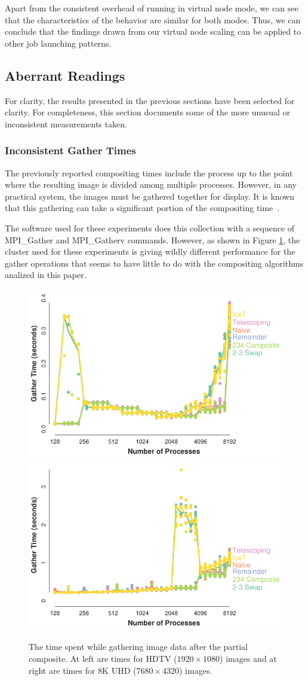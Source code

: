 \documentclass{vgtc}                          %
\newcommand*{\lcite}[1]{~\cite{#1}}
\begin{document}
Apart from the consistent overhead of running in virtual node mode, we can see that the characteristics of the behavior are similar for both modes.
Thus, we can conclude that the findings drawn from our virtual node scaling can be applied to other job launching patterns.

\subsection{Aberrant Readings}

For clarity, the results presented in the previous sections have been selected for clarity.
For completeness, this section documents some of the more unusual or inconsistent measurements taken.

\subsubsection{Inconsistent Gather Times}
\label{sec:Gather}

The previously reported compositing times include the process up to the point where the resulting image is divided among multiple processes.
However, in any practical system, the images must be gathered together for display.
It is known that this gathering can take a significant portion of the compositing time\lcite{Rabenseifner2004,Moreland2011:SC,Larsen2016,Nonaka2018}.

The software used for these experiments does this collection with a sequence of MPI\_Gather and MPI\_Gatherv commands.
However, as shown in Figure \ref{fig:GatherTimes}, the cluster used for these experiments is giving wildly different performance for the gather operations that seems to have little to do with the compositing algorithms analized in this paper.

\begin{figure}
  \centering
  \includegraphics[width=.5\linewidth]{gather-hdtv}%
  \includegraphics[width=.5\linewidth]{gather-8k}
  \caption{
    The time spent while gathering image data after the partial composite.
    At left are times for HDTV ($1920 \times 1080$) images and at right are times for 8K UHD ($7680 \times 4320$) images.
  }
  \label{fig:GatherTimes}
\end{figure}
\end{document}
